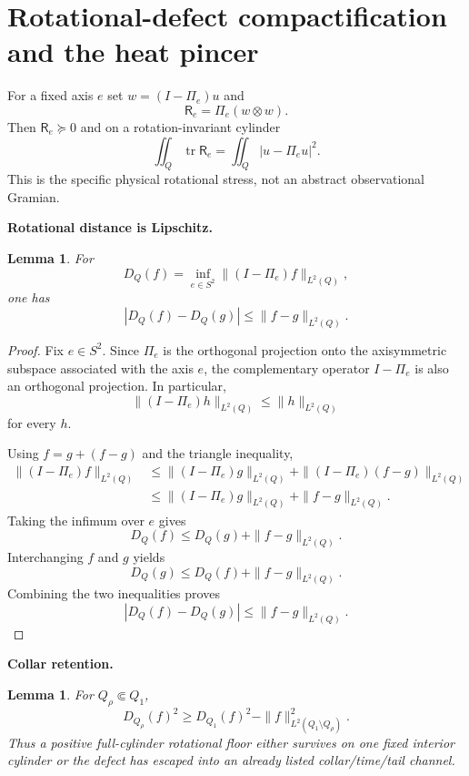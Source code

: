 \documentclass[11pt]{article}
\newtheorem{lemma}[theorem]{Lemma}
\theoremstyle{definition}\newtheorem{problem}[theorem]{Problem}
\theoremstyle{definition}
\theoremstyle{remark}
\begin{document}
\section{Rotational-defect compactification and the heat pincer}
\label{sec:rot-pincer}

For a fixed axis $e$ set $w=(I-\Pi_e)u$ and
\[
 \mathsf R_e=\Pi_e(w\otimes w).
\]
Then $\mathsf R_e\succeq0$ and on a rotation-invariant cylinder
\[
 \boxed{
 \iint_Q\operatorname{tr}\mathsf R_e
 =\iint_Q|u-\Pi_eu|^2.
 }
\]
This is the specific physical rotational stress, not an abstract observational
Gramian.

\medskip
\noindent\textbf{Rotational distance is Lipschitz.}
\begin{lemma}
For
\[
 D_Q(f)=\inf_{e\in S^2}\|(I-\Pi_e)f\|_{L^2(Q)},
\]
one has
\[
 \boxed{|D_Q(f)-D_Q(g)|\le\|f-g\|_{L^2(Q)}}.
\]
\end{lemma}

\begin{proof}
Fix \(e\in S^2\).  Since \(\Pi_e\) is the orthogonal projection onto the
axisymmetric subspace associated with the axis \(e\), the complementary
operator \(I-\Pi_e\) is also an orthogonal projection.  In particular,
\[
 \|(I-\Pi_e)h\|_{L^2(Q)}\le\|h\|_{L^2(Q)}
\]
for every \(h\).

Using \(f=g+(f-g)\) and the triangle inequality,
\[
\begin{aligned}
 \|(I-\Pi_e)f\|_{L^2(Q)}
 &\le \|(I-\Pi_e)g\|_{L^2(Q)}
   +\|(I-\Pi_e)(f-g)\|_{L^2(Q)}\\
 &\le \|(I-\Pi_e)g\|_{L^2(Q)}+\|f-g\|_{L^2(Q)}.
\end{aligned}
\]
Taking the infimum over \(e\) gives
\[
 D_Q(f)\le D_Q(g)+\|f-g\|_{L^2(Q)}.
\]
Interchanging \(f\) and \(g\) yields
\[
 D_Q(g)\le D_Q(f)+\|f-g\|_{L^2(Q)}.
\]
Combining the two inequalities proves
\[
 |D_Q(f)-D_Q(g)|\le\|f-g\|_{L^2(Q)}.
\]
\end{proof}

\medskip
\noindent\textbf{Collar retention.}
\begin{lemma}
For $Q_\rho\Subset Q_1$,
\[
 D_{Q_\rho}(f)^2
 \ge D_{Q_1}(f)^2-\|f\|_{L^2(Q_1\setminus Q_\rho)}^2.
\]
Thus a positive full-cylinder rotational floor either survives on one fixed
interior cylinder or the defect has escaped into an already listed
collar/time/tail channel.
\end{lemma}
\end{document}
